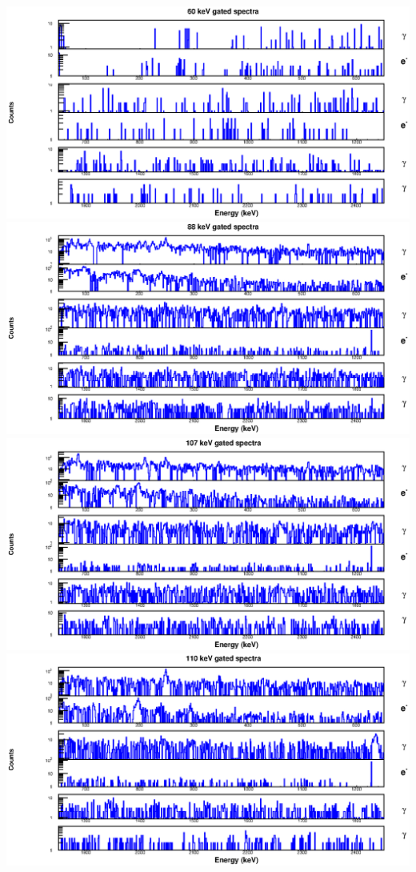 \begin{landscape}
\includegraphics[scale=1.2]{154Gd_Appendix/60_combined.eps}
\includegraphics[scale=1.2]{154Gd_Appendix/88_combined.eps}
\includegraphics[scale=1.2]{154Gd_Appendix/107_combined.eps}
\includegraphics[scale=1.2]{154Gd_Appendix/110_combined.eps}

\end{landscape}
